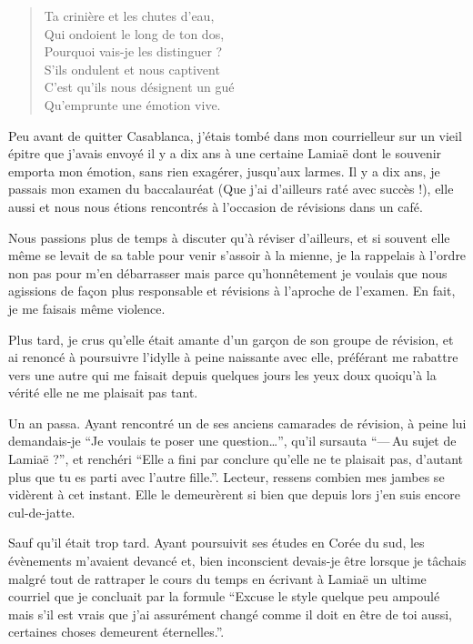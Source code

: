 \begin{verse}\sizain
  Ta crinière et les chutes d’eau,\\ 
  Qui ondoient le long de ton dos,\\ 
  Pourquoi vais-je les distinguer ?\\ 
  S’ils ondulent et nous captivent\\ 
  C’est qu’ils nous désignent un gué\\ 
  Qu’emprunte une émotion vive.  %
\end{verse}

\begin{prose}
  Peu avant de quitter Casablanca, j’étais tombé dans mon courrielleur sur un vieil épitre que j’avais envoyé il y a dix ans à une certaine Lamiaë dont le souvenir emporta mon émotion, sans rien exagérer, jusqu’aux larmes. Il y a dix ans, je passais mon examen du baccalauréat (Que j’ai d’ailleurs raté avec succès !), elle aussi et nous nous étions rencontrés à l’occasion de révisions dans un café.

  Nous passions plus de temps à discuter qu’à réviser d’ailleurs, et si souvent elle même se levait de sa table pour venir s’assoir à la mienne, je la rappelais à l’ordre non pas pour m’en débarrasser mais parce qu’honnêtement je voulais que nous agissions de façon plus responsable et révisions à l’aproche de l’examen. En fait, je me faisais même violence.

  Plus tard, je crus qu’elle était amante d’un garçon de son groupe de révision, et ai renoncé à poursuivre l’idylle à peine naissante avec elle, préférant me rabattre vers une autre qui me faisait depuis quelques jours les yeux doux quoiqu’à la vérité elle ne me plaisait pas tant.

  Un an passa. Ayant rencontré un de ses anciens camarades de révision, à peine lui demandais-je \enquote{Je voulais te poser une question…}, qu’il sursauta \enquote{—\,Au sujet de Lamiaë ?}, et renchéri \enquote{Elle a fini par conclure qu’elle ne te plaisait pas, d’autant plus que tu es parti avec l’autre fille.}. Lecteur, ressens combien mes jambes se vidèrent à cet instant. Elle le demeurèrent si bien que depuis lors j’en suis encore cul-de-jatte.

  Sauf qu’il était trop tard. Ayant poursuivit ses études en Corée du sud, les évènements m’avaient devancé et, bien inconscient devais-je être lorsque je tâchais malgré tout de rattraper le cours du temps  en écrivant à Lamiaë un ultime courriel que je concluait par la formule \enquote{Excuse le style quelque peu ampoulé mais s’il est vrais que j’ai assurément changé comme il doit en être de toi aussi, certaines choses demeurent éternelles.}.
\end{prose}

